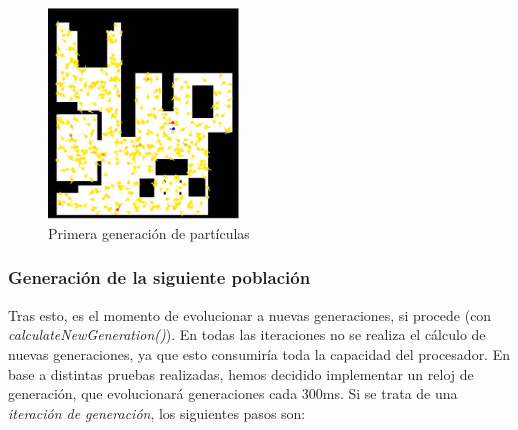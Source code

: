 \begin{figure}[H]
\begin{center}
	\includegraphics[width=0.45\textwidth]{figures/primerageneracion.png}
	\caption{Primera generación de partículas}
	\label{fig.primerageneracion}
	\end{center}
\end{figure}  

\subsubsection{Generación de la siguiente población}
Tras esto, es el momento de evolucionar a nuevas generaciones, si procede (con \textit{calculateNewGeneration()}). En todas las iteraciones no se realiza el cálculo de nuevas generaciones, ya que esto consumiría toda la capacidad del procesador. En base a distintas pruebas realizadas, hemos decidido implementar un reloj de generación, que evolucionará generaciones cada 300ms.
Si se trata de una \textit{iteración de generación}, los siguientes pasos son:

